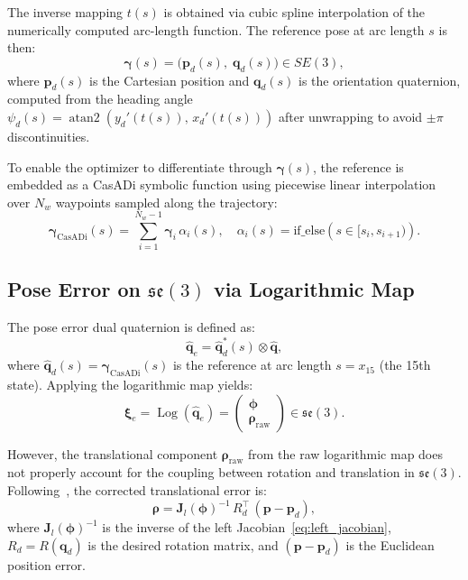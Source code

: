 \documentclass[journal]{IEEEtran}
\newcommand{\dq}{\hat{\bm{q}}}           %
\newcommand{\dqd}{\hat{\bm{q}}_d}        %
\newcommand{\dqe}{\hat{\bm{q}}_e}        %
\newcommand{\se}{\mathfrak{se}(3)}        %
\newcommand{\SE}{SE(3)}                   %
\DeclareMathOperator{\Log}{Log}
\DeclareMathOperator{\atan}{atan2}
\begin{document}
The inverse mapping $t(s)$ is obtained via cubic spline interpolation of the numerically computed arc-length function. The reference pose at arc length $s$ is then:
\begin{equation}
    \bm{\gamma}(s) = \big(\bm{p}_d(s),\; \bm{q}_d(s)\big) \in \SE,
    \label{eq:gamma}
\end{equation}
where $\bm{p}_d(s)$ is the Cartesian position and $\bm{q}_d(s)$ is the orientation quaternion, computed from the heading angle $\psi_d(s) = \atan(y_d'(t(s)),\, x_d'(t(s)))$ after unwrapping to avoid $\pm\pi$ discontinuities.

To enable the optimizer to differentiate through $\bm{\gamma}(s)$, the reference is embedded as a CasADi symbolic function using piecewise linear interpolation over $N_w$ waypoints sampled along the trajectory:
\begin{equation}
    \bm{\gamma}_{\text{CasADi}}(s) = \sum_{i=1}^{N_w-1} \bm{\gamma}_i\, \alpha_i(s), \quad \alpha_i(s) = \text{if\_else}\left(s \in [s_i, s_{i+1})\right).
    \label{eq:casadi_interp}
\end{equation}

\subsection{Pose Error on $\se$ via Logarithmic Map}

The pose error dual quaternion is defined as:
\begin{equation}
    \dqe = \dqd^*(s) \otimes \dq,
    \label{eq:dq_error}
\end{equation}
where $\dqd(s) = \bm{\gamma}_{\text{CasADi}}(s)$ is the reference at arc length $s = x_{15}$ (the 15th state). Applying the logarithmic map yields:
\begin{equation}
    \bm{\xi}_e = \Log(\dqe) = \begin{pmatrix} \bm{\phi} \\ \bm{\rho}_{\text{raw}} \end{pmatrix} \in \se.
    \label{eq:log_error}
\end{equation}

However, the translational component $\bm{\rho}_{\text{raw}}$ from the raw logarithmic map does not properly account for the coupling between rotation and translation in $\se$. Following~\cite{sola2018micro}, the corrected translational error is:
\begin{equation}
    \bm{\rho} = \bm{J}_l(\bm{\phi})^{-1}\, R_d^\top\, (\bm{p} - \bm{p}_d),
    \label{eq:rho}
\end{equation}
where $\bm{J}_l(\bm{\phi})^{-1}$ is the inverse of the left Jacobian~\eqref{eq:left_jacobian}, $R_d = R(\bm{q}_d)$ is the desired rotation matrix, and $(\bm{p} - \bm{p}_d)$ is the Euclidean position error.
\end{document}
